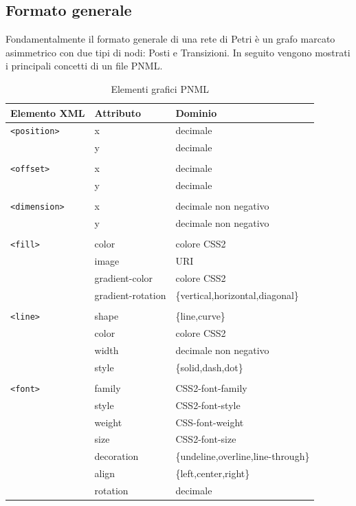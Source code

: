 \documentclass[italian,12pt]{book}
\begin{document}
\subsection{Formato generale}
Fondamentalmente il formato generale di una rete di Petri è un
grafo marcato asimmetrico con due tipi di nodi: Posti e
Transizioni. In seguito vengono mostrati i principali concetti di
un file PNML.

\begin{table}
  \begin{tabular}{|l|ll|}
    \hline
    Elemento XML & Attributo & Dominio \\
    \hline
    {\tt<position>} & x & decimale \\
    & y & decimale \\
    & & \\
    {\tt<offset>}   & x & decimale \\
    & y & decimale \\
    & & \\
    {\tt<dimension>} & x & decimale non negativo \\
    & y & decimale non negativo \\
    & & \\
    {\tt<fill>}     & color & colore CSS2 \\
    & image & URI \\
    & gradient-color & colore CSS2 \\
    & gradient-rotation & \{vertical,horizontal,diagonal\} \\
    & & \\
    {\tt<line>}     & shape & \{line,curve\} \\
    & color & colore CSS2 \\
    & width & decimale non negativo \\
    & style & \{solid,dash,dot\} \\
    & & \\
    {\tt<font>}     & family & CSS2-font-family \\
    & style  & CSS2-font-style \\
    & weight & CSS-font-weight \\
    & size   & CSS2-font-size \\
    & decoration & \{undeline,overline,line-through\} \\
    & align  & \{left,center,right\} \\
    & rotation & decimale \\
    \hline
  \end{tabular}
  \caption{Elementi grafici PNML\label{PNML_elementi_grafici}}
\end{table}
\end{document}
